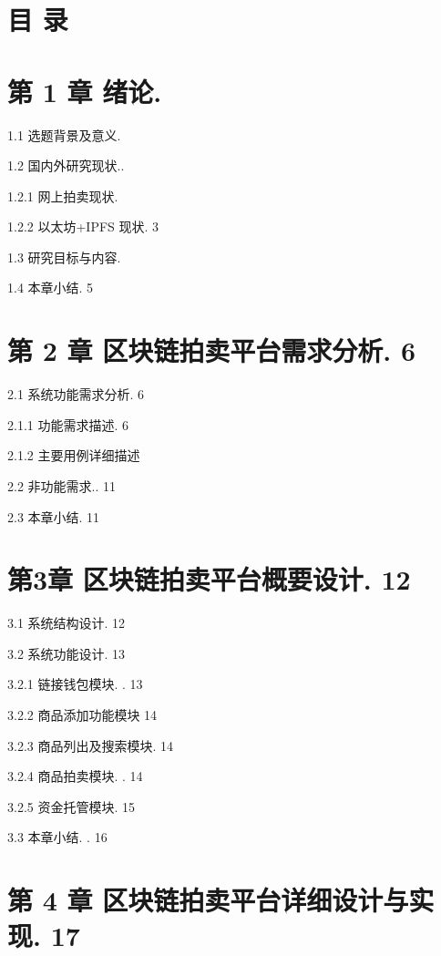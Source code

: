 \documentclass[
  10
]{article}
\begin{document}
\section{目 录}\label{ux76ee-ux5f55}

\section{第 1 章 绪论.}\label{ux7b2c-1-ux7ae0-ux7eeaux8bba.}

1.1 选题背景及意义.

1.2 国内外研究现状..

1.2.1 网上拍卖现状.

1.2.2 以太坊+IPFS 现状. 3

1.3 研究目标与内容.

1.4 本章小结. 5

\section{第 2 章 区块链拍卖平台需求分析.
6}\label{ux7b2c-2-ux7ae0-ux533aux5757ux94feux62cdux5356ux5e73ux53f0ux9700ux6c42ux5206ux6790.-6}

2.1 系统功能需求分析. 6

2.1.1 功能需求描述. 6

2.1.2 主要用例详细描述

2.2 非功能需求.. 11

2.3 本章小结. 11

\section{第3章 区块链拍卖平台概要设计.
12}\label{ux7b2c3ux7ae0-ux533aux5757ux94feux62cdux5356ux5e73ux53f0ux6982ux8981ux8bbeux8ba1.-12}

3.1 系统结构设计. 12

3.2 系统功能设计. 13

3.2.1 链接钱包模块. . 13

3.2.2 商品添加功能模块 14

3.2.3 商品列出及搜索模块. 14

3.2.4 商品拍卖模块. . 14

3.2.5 资金托管模块. 15

3.3 本章小结. . 16

\section{第 4 章 区块链拍卖平台详细设计与实现.
17}\label{ux7b2c-4-ux7ae0-ux533aux5757ux94feux62cdux5356ux5e73ux53f0ux8be6ux7ec6ux8bbeux8ba1ux4e0eux5b9eux73b0.-17}
\end{document}
